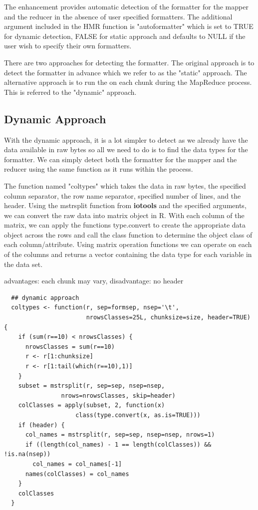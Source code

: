 \documentclass[11pt]{book}
\newcommand{\pkg}[1]{\textsf{ \bf #1}}
\begin{document}
The enhancement provides automatic detection of the formatter for the mapper and the reducer in the absence of user specified formatters. The additional argument included in the HMR function is "autoformatter" which is set to TRUE for dynamic detection, FALSE for static approach and defaults to NULL if the user wish to specify their own formatters.

There are two approaches for detecting the formatter. The original approach is to detect the formatter in advance which we refer to as the "static" approach. The alternative approach is to run the on each chunk during the MapReduce process. This is referred to the "dynamic" approach.

\subsection{Dynamic Approach}

With the dynamic approach, it is a lot simpler to detect as we already have the data available in raw bytes so all we need to do is to find the data types for the formatter. We can simply detect both the formatter for the mapper and the reducer using the same function as it runs within the process. 

The function named "coltypes" which takes the data in raw bytes, the specified column separator, the row name separator, specified number of lines, and the header. Using the mstrsplit function from\pkg{iotools} and the specified arguments, we can convert the raw data into matrix object in R. With each column of the matrix, we can apply the functions type.convert to create the appropriate data object across the rows and call the class function to determine the object class of each column/attribute. Using matrix operation functions we can operate on each of the columns and returns a vector containing the data type for each variable in the data set.

advantages: each chunk may vary, 
disadvantage: no header

\begin{verbatim}
  ## dynamic approach
  coltypes <- function(r, sep=formsep, nsep='\t', 
                       nrowsClasses=25L, chunksize=size, header=TRUE) {
    if (sum(r==10) < nrowsClasses) {
      nrowsClasses = sum(r==10)
      r <- r[1:chunksize]
      r <- r[1:tail(which(r==10),1)]
    }
    subset = mstrsplit(r, sep=sep, nsep=nsep, 
    			nrows=nrowsClasses, skip=header)
    colClasses = apply(subset, 2, function(x) 
    				class(type.convert(x, as.is=TRUE)))
    if (header) {
      col_names = mstrsplit(r, sep=sep, nsep=nsep, nrows=1)
      if ((length(col_names) - 1 == length(colClasses)) && !is.na(nsep))
        col_names = col_names[-1]
      names(colClasses) = col_names
    }
    colClasses
  }
\end{verbatim}
\end{document}
